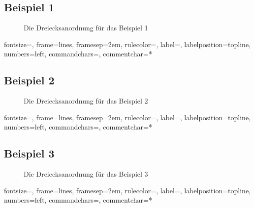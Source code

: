 \documentclass[a4paper, notitlepage, 12pt,headinclude]{scrartcl}
\begin{document}
\subsection{Beispiel 1}
\begin{figure}[H] 
	
	\caption{Die Dreiecksanordnung für das Beispiel 1}
\end{figure}
%
{fontsize=\footnotesize,
	frame=lines,  %
	framesep=2em, %
	rulecolor=\color{Gray},
	label=,
	labelposition=topline,
	numbers=left,
	commandchars=\|\(\), %
	commentchar=*        %
}
\subsection{Beispiel 2}
\begin{figure}[H] 
	
	\caption{Die Dreiecksanordnung für das Beispiel 2}
\end{figure}
%
{fontsize=\footnotesize,
	frame=lines,  %
	framesep=2em, %
	rulecolor=\color{Gray},
	label=,
	labelposition=topline,
	numbers=left,
	commandchars=\|\(\), %
	commentchar=*        %
}
\subsection{Beispiel 3}
\begin{figure}[H] 
	
	\caption{Die Dreiecksanordnung für das Beispiel 3}
\end{figure}
%
{fontsize=\footnotesize,
	frame=lines,  %
	framesep=2em, %
	rulecolor=\color{Gray},
	label=,
	labelposition=topline,
	numbers=left,
	commandchars=\|\(\), %
	commentchar=*        %
}
\end{document}
